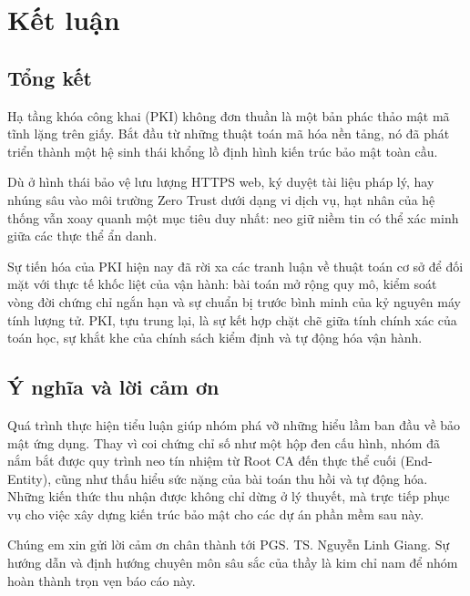 \chapter{Kết luận}
\label{chap:conclusion}

\section{Tổng kết}
\label{sec:8.1}

Hạ tầng khóa công khai (PKI) không đơn thuần là một bản phác thảo mật mã tĩnh lặng trên giấy. Bắt đầu từ những thuật toán mã hóa nền tảng, nó đã phát triển thành một hệ sinh thái khổng lồ định hình kiến trúc bảo mật toàn cầu. 

Dù ở hình thái bảo vệ lưu lượng HTTPS web, ký duyệt tài liệu pháp lý, hay nhúng sâu vào môi trường Zero Trust dưới dạng vi dịch vụ, hạt nhân của hệ thống vẫn xoay quanh một mục tiêu duy nhất: neo giữ niềm tin có thể xác minh giữa các thực thể ẩn danh. 

Sự tiến hóa của PKI hiện nay đã rời xa các tranh luận về thuật toán cơ sở để đối mặt với thực tế khốc liệt của vận hành: bài toán mở rộng quy mô, kiểm soát vòng đời chứng chỉ ngắn hạn và sự chuẩn bị trước bình minh của kỷ nguyên máy tính lượng tử. PKI, tựu trung lại, là sự kết hợp chặt chẽ giữa tính chính xác của toán học, sự khắt khe của chính sách kiểm định và tự động hóa vận hành.

\section{Ý nghĩa và lời cảm ơn}
\label{sec:8.2}

Quá trình thực hiện tiểu luận giúp nhóm phá vỡ những hiểu lầm ban đầu về bảo mật ứng dụng. Thay vì coi chứng chỉ số như một hộp đen cấu hình, nhóm đã nắm bắt được quy trình neo tín nhiệm từ Root CA đến thực thể cuối (End-Entity), cũng như thấu hiểu sức nặng của bài toán thu hồi và tự động hóa. Những kiến thức thu nhận được không chỉ dừng ở lý thuyết, mà trực tiếp phục vụ cho việc xây dựng kiến trúc bảo mật cho các dự án phần mềm sau này.

Chúng em xin gửi lời cảm ơn chân thành tới PGS. TS. Nguyễn Linh Giang. Sự hướng dẫn và định hướng chuyên môn sâu sắc của thầy là kim chỉ nam để nhóm hoàn thành trọn vẹn báo cáo này.
